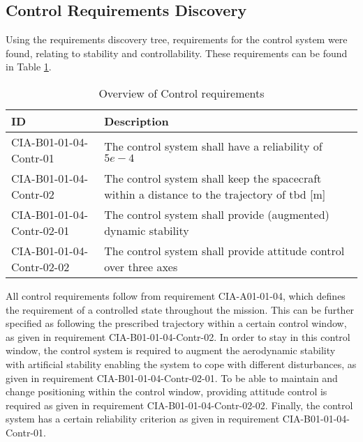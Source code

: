 \subsection{Control Requirements Discovery} \label{sec:req-control}
Using the requirements discovery tree, requirements for the control system were found, relating to stability and controllability. These requirements can be found in Table \ref{tab:controlreq}.

\begin{table}[H]
	\caption{Overview of Control requirements}
	\begin{tabular}{|p{}|p{}|}
		\hline
		ID         					&	Description																							\\ \hline \hline
		CIA-B01-01-04-Contr-01		&	The control system shall have a reliability of $5e-4$            									\\ \hline
		CIA-B01-01-04-Contr-02 		&	The control system shall keep the spacecraft within a distance to the trajectory of \gls{tbd} [m]	\\ \hline	
		CIA-B01-01-04-Contr-02-01 	&	The control system shall provide (augmented) dynamic stability       								\\ \hline
		CIA-B01-01-04-Contr-02-02 	&	The control system shall provide attitude control over three axes         							\\ \hline	
	\end{tabular}
	\label{tab:controlreq}
\end{table}

All control requirements follow from requirement CIA-A01-01-04, which defines the requirement of a controlled state throughout the mission. 
This can be further specified as following the prescribed trajectory within a certain control window, as given in requirement CIA-B01-01-04-Contr-02. 
In order to stay in this control window, the control system is required to augment the aerodynamic stability with artificial stability enabling the system to cope with different disturbances, as given in requirement CIA-B01-01-04-Contr-02-01. 
To be able to maintain and change positioning within the control window, providing attitude control is required as given in requirement CIA-B01-01-04-Contr-02-02. 
Finally, the control system has a certain reliability criterion as given in requirement CIA-B01-01-04-Contr-01.